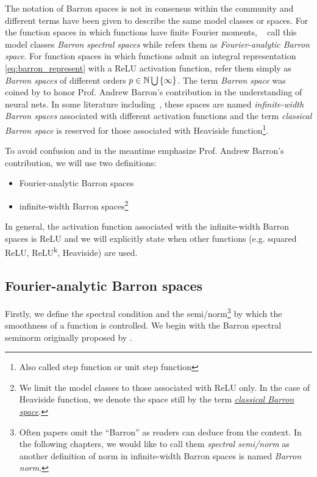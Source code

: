The notation of Barron spaces is not in consensus within the community and
different terms have been given to describe the same model classes or spaces.
For the function spaces in which functions have finite Fourier moments,
~\cite{xuFiniteNeuronMethod2020} call this model classes \textit{Barron spectral
spaces} while \cite{carageaNeuralNetworkApproximation2022} refers them as
\textit{Fourier-analytic Barron space}.  For function spaces in which functions
admit an integral representation \eqref{eq:barron_represent} with a ReLU
activation function, \cite{eBarronSpaceFlowinduced2021} refer them simply as
\textit{Barron spaces} of different orders $p \in \mathbb{N} \bigcup\,\{\infty\}$. The
term \textit{Barron space} was coined by \cite{ePrioriEstimatesPopulation2019}
to honor Prof. Andrew Barron's contribution in the understanding of neural nets.
In some literature including~\cite{carageaNeuralNetworkApproximation2022}, these
spaces are named \textit{infinite-width Barron spaces} associated with different
activation functions and the term \textit{classical Barron space} is reserved
for those associated with Heaviside function\footnote{Also called step function
or unit step function}.

To avoid confusion and in the meantime emphasize Prof. Andrew Barron's
contribution, we will use two definitions:
\begin{itemize}
    \item Fourier-analytic Barron spaces
    \item infinite-width Barron spaces\footnote{
        We limit the model classes to those associated with ReLU only. In the 
        case of Heaviside function, we denote the space still by the term 
        \hyperref[def:heaviside_space]{\textit{classical Barron space}}.
    }
\end{itemize}

In general, the activation function associated with the infinite-width Barron
spaces is ReLU and we will explicitly state when other functions (e.g. squared
ReLU, ReLU\textsuperscript{k}, Heaviside) are used.


\subsection{Fourier-analytic Barron spaces}

Firstly, we define the spectral condition and the semi/norm\footnote{
    Often papers omit the ``Barron'' as readers can deduce from the context. 
    In the following chapters, we would like to call them \textit{spectral 
    semi/norm} as another definition of norm in infinite-width Barron spaces is 
    named \textit{Barron norm}.
} by which the smoothness of a function
is controlled. We begin with the Barron spectral seminorm originally proposed
 by \cite{barronUniversalApproximationBounds1993}.

